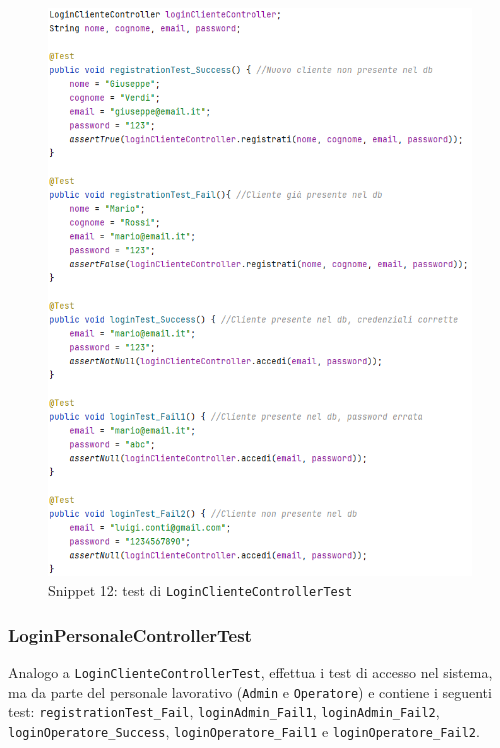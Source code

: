 \documentclass{article}
\newcommand{\code}[1]{\texttt{#1}}
\begin{document}
\begin{figure}[H]
    \centering
    \includegraphics[scale=0.5]{resources/images/Snippets/snippet_LoginClienteControllerTest.png}
    \captionsetup{labelformat=empty,labelsep=none}
    \caption{Snippet 12: test di \code{LoginClienteControllerTest}}
    \label{fig:snippet_LoginClienteControllerTest}
\end{figure}

\newpage

\subsubsection{LoginPersonaleControllerTest}
Analogo a \code{LoginClienteControllerTest}, effettua i test di accesso nel sistema, ma da parte del personale lavorativo (\code{Admin} e \code{Operatore}) e contiene i seguenti test: \code{registrationTest\_Fail}, \code{loginAdmin\_Fail1}, \code{loginAdmin\_Fail2}, \code{loginOperatore\_Success}, \code{loginOperatore\_Fail1} e \code{loginOperatore\_Fail2}.
\end{document}
